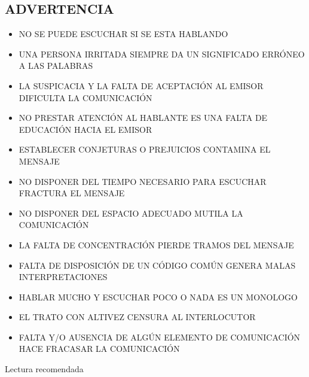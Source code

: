 \subsection*{ADVERTENCIA}
\begin{itemize}
  \item NO SE PUEDE ESCUCHAR SI SE ESTA HABLANDO
  \item UNA PERSONA IRRITADA SIEMPRE DA UN SIGNIFICADO ERRÓNEO A LAS PALABRAS
  \item LA SUSPICACIA Y LA FALTA DE ACEPTACIÓN AL EMISOR DIFICULTA LA COMUNICACIÓN
  \item NO PRESTAR ATENCIÓN AL HABLANTE ES UNA FALTA DE EDUCACIÓN HACIA EL EMISOR
  \item ESTABLECER CONJETURAS O PREJUICIOS CONTAMINA EL MENSAJE
  \item NO DISPONER DEL TIEMPO NECESARIO PARA ESCUCHAR FRACTURA EL MENSAJE
  \item NO DISPONER DEL ESPACIO ADECUADO MUTILA LA COMUNICACIÓN
  \item LA FALTA DE CONCENTRACIÓN PIERDE TRAMOS DEL MENSAJE
  \item FALTA DE DISPOSICIÓN DE UN CÓDIGO COMÚN GENERA MALAS INTERPRETACIONES
  \item HABLAR MUCHO Y ESCUCHAR POCO O NADA ES UN MONOLOGO
  \item EL TRATO CON ALTIVEZ CENSURA AL INTERLOCUTOR
  \item FALTA Y/O AUSENCIA DE ALGÚN ELEMENTO DE COMUNICACIÓN HACE FRACASAR LA COMUNICACIÓN
\end{itemize}
Lectura recomendada

